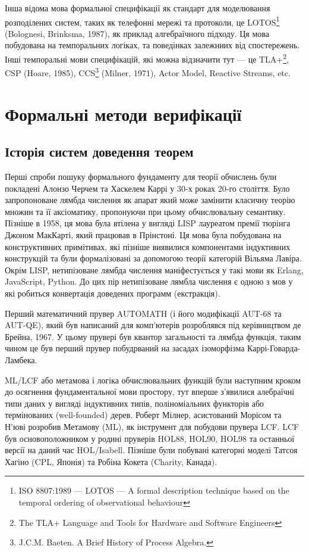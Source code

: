 \documentclass{article}
\begin{document}
Інша відома мова формальної специфікації як стандарт для моделювання розподілених систем,
таких як телефонні мережі та протоколи, це
LOTOS\footnote{ISO 8807:1989 --- LOTOS --- A formal description technique based
on the temporal ordering of observational behaviour} (Bolognesi, Brinksma, 1987), як приклад алгебраїчного підходу.
Ця мова побудована на темпоральних логіках, та поведінках залежниих від спостережень.
Інші темпоральні мови специфікацій, які можна відзначити тут --- це TLA+\footnote{The
TLA+ Language and Tools for Hardware and Software Engineers}, CSP (Hoare, 1985),
CCS\footnote{J.C.M. Baeten. A Brief History of Process Algebra.} (Milner, 1971), Actor Model, Reactive Streams, etc.

\section{Формальні методи верифікації}


\subsection{Історія систем доведення теорем}
Перші спроби пошуку формального фундаменту для теорії обчислень були покладені
Алонзо Черчем та Хаскелем Каррі у 30-х роках 20-го століття. Було запропоноване
лямбда числення як апарат який може замінити класичну теорію множин та її аксіоматику,
пропонуючи при цьому обчислювальну семантику. Пізніше в 1958, ця мова була втілена
у вигляді LISP лауреатом премії тюрінга Джоном МакКарті, який працював в Прінстоні.
Ця мова була побудована на конструктивних примітивах, які пізніше виявилися компонентами
індуктивних конструкцій та були формалізовані за допомогою
теорії категорій Вільяма Лавіра. Окрім LISP, нетипізоване лямбда числення
маніфестується у такі мови як Erlang, JavaScript, Python.
До цих пір нетипізоване лямбла числення є одною з мов у які робиться
конвертація доведених программ (екстракція).

Перший математичний прувер AUTOMATH (і його модифікації AUT-68 та AUT-QE),
який був написаний для комп'ютерів розроблявся під керівництвом де Брейна, 1967.
У цьому прувері був квантор загальності та лямбда функція, таким чином це був перший прувер
побудрваний на засадах ізоморфізма Каррі-Говарда-Ламбека.

ML/LCF або метамова і логіка обчислювальних функцій були наступним кроком до
осягнення фундаментальної мови простору, тут вперше з'явилися алебраїчні типи даних
у вигляді індуктивних типів, поліноміальних функторів або термінованих (well-founded) дерев.
Роберт Мілнер, асистований Морісом та Н'юві розробив Метамову (ML), як
інструмент для побудови прувера LCF. LCF був основоположником у родині пруверів
HOL88, HOL90, HOL98 та останньої версії на даний час HOL/Isabell.
Пізніше були побувані категорні моделі Татсоя Хагіно (CPL, Японія)
та Робіна Кокета (Charity, Канада).
\end{document}
